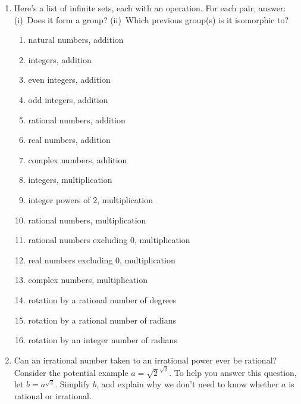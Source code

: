 \documentclass[../gatm.tex]{subfiles}
\begin{document}
\begin{enumerate}
\setcounter{enumi}{\value{inf_problem_i}}
\item Here’s a list of infinite sets, each with an operation. For each pair, answer: (i)~Does it form a group? (ii)~Which previous group(s) is it isomorphic to?
\begin{enumerate}
\item natural numbers, addition
\item integers, addition
\item even integers, addition
\item odd integers, addition
\item rational numbers, addition
\item real numbers, addition
\item complex numbers, addition
\item integers, multiplication
\item integer powers of $2$, multiplication
\item rational numbers, multiplication
\item rational numbers excluding $0$, multiplication
\item real numbers excluding $0$, multiplication
\item complex numbers, multiplication
\item rotation by a rational number of degrees
\item rotation by a rational number of radians
\item rotation by an integer number of radians
\end{enumerate}
\item Can an irrational number taken to an irrational power ever be rational? Consider the potential example $a = \sqrt{2}^{\sqrt{2}}$. To help you answer this question, let $b = a^{\sqrt{2}}$. Simplify $b$, and explain why we don’t need to know whether $a$ is rational or irrational.
\end{enumerate}
\end{document}
